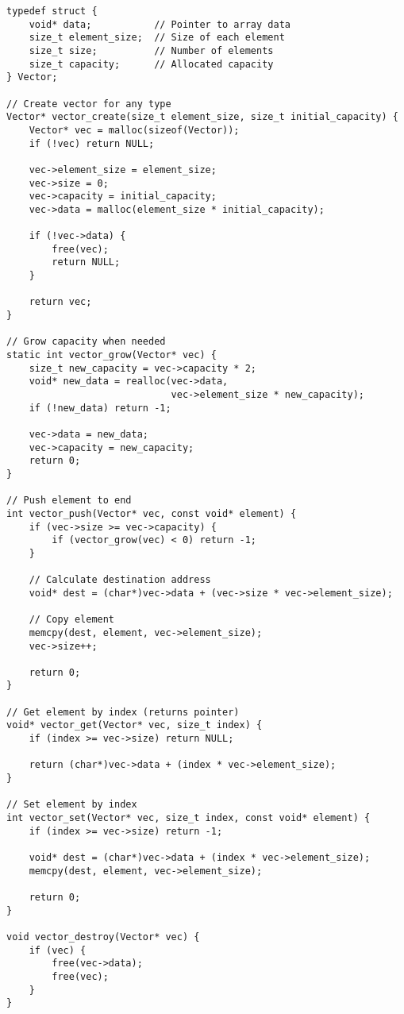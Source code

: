 \begin{lstlisting}
typedef struct {
    void* data;           // Pointer to array data
    size_t element_size;  // Size of each element
    size_t size;          // Number of elements
    size_t capacity;      // Allocated capacity
} Vector;

// Create vector for any type
Vector* vector_create(size_t element_size, size_t initial_capacity) {
    Vector* vec = malloc(sizeof(Vector));
    if (!vec) return NULL;

    vec->element_size = element_size;
    vec->size = 0;
    vec->capacity = initial_capacity;
    vec->data = malloc(element_size * initial_capacity);

    if (!vec->data) {
        free(vec);
        return NULL;
    }

    return vec;
}

// Grow capacity when needed
static int vector_grow(Vector* vec) {
    size_t new_capacity = vec->capacity * 2;
    void* new_data = realloc(vec->data,
                             vec->element_size * new_capacity);
    if (!new_data) return -1;

    vec->data = new_data;
    vec->capacity = new_capacity;
    return 0;
}

// Push element to end
int vector_push(Vector* vec, const void* element) {
    if (vec->size >= vec->capacity) {
        if (vector_grow(vec) < 0) return -1;
    }

    // Calculate destination address
    void* dest = (char*)vec->data + (vec->size * vec->element_size);

    // Copy element
    memcpy(dest, element, vec->element_size);
    vec->size++;

    return 0;
}

// Get element by index (returns pointer)
void* vector_get(Vector* vec, size_t index) {
    if (index >= vec->size) return NULL;

    return (char*)vec->data + (index * vec->element_size);
}

// Set element by index
int vector_set(Vector* vec, size_t index, const void* element) {
    if (index >= vec->size) return -1;

    void* dest = (char*)vec->data + (index * vec->element_size);
    memcpy(dest, element, vec->element_size);

    return 0;
}

void vector_destroy(Vector* vec) {
    if (vec) {
        free(vec->data);
        free(vec);
    }
}
\end{lstlisting}

